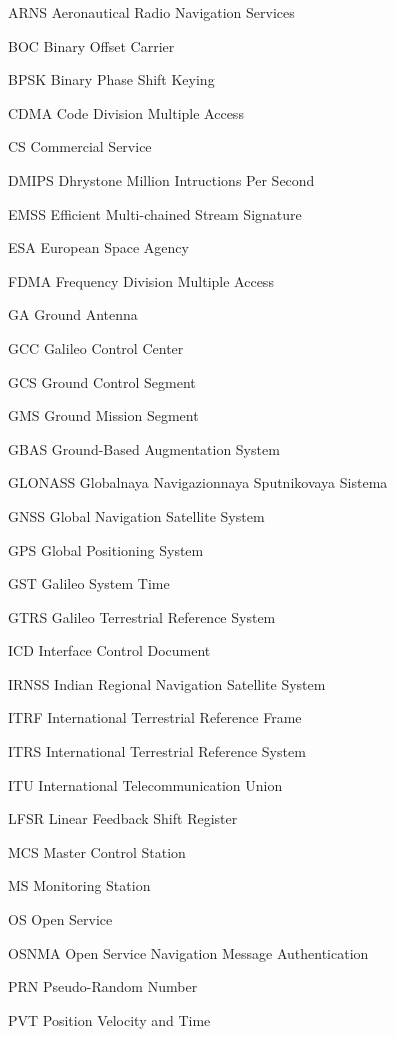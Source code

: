\begin{abbreviations}

\item[ARNS] Aeronautical Radio Navigation Services
\item[BOC] Binary Offset Carrier
\item[BPSK] Binary Phase Shift Keying
\item[CDMA] Code Division Multiple Access
\item[CS] Commercial Service
\item[DMIPS] Dhrystone Million Intructions Per Second
\item[EMSS] Efficient Multi-chained Stream Signature
\item[ESA] European Space Agency
\item[FDMA] Frequency Division Multiple Access
\item[GA] Ground Antenna
\item[GCC] Galileo Control Center
\item[GCS] Ground Control Segment
\item[GMS] Ground Mission Segment 
\item[GBAS] Ground-Based Augmentation System
\item[GLONASS] Globalnaya Navigazionnaya Sputnikovaya Sistema
\item[GNSS] Global Navigation Satellite System
\item[GPS] Global Positioning System
\item[GST] Galileo System Time
\item[GTRS] Galileo Terrestrial Reference System
\item[ICD] Interface Control Document
\item[IRNSS] Indian Regional Navigation Satellite System
\item[ITRF] International Terrestrial Reference Frame
\item[ITRS] International Terrestrial Reference System
\item[ITU] International Telecommunication Union
\item[LFSR] Linear Feedback Shift Register
\item[MCS] Master Control Station
\item[MS] Monitoring Station
\item[OS] Open Service
\item[OSNMA] Open Service Navigation Message Authentication
\item[PRN] Pseudo-Random Number
\item[PVT] Position Velocity and Time

\end{abbreviations}

